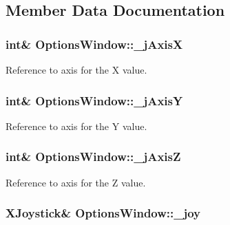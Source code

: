 \subsection{Member Data Documentation}
\hypertarget{a00006_a01d6284355011203ee6e8856a0bdf557}{}
\subsubsection[{\+\_\+j\+Axis\+X}]{\setlength{\rightskip}{0pt plus 5cm}int\& Options\+Window\+::\+\_\+j\+Axis\+X\hspace{0.3cm}{\ttfamily [private]}}\label{a00006_a01d6284355011203ee6e8856a0bdf557}


Reference to axis for the X value. 

\hypertarget{a00006_a8921d1cc5bcb527466c28feb5dcc59b1}{}
\subsubsection[{\+\_\+j\+Axis\+Y}]{\setlength{\rightskip}{0pt plus 5cm}int\& Options\+Window\+::\+\_\+j\+Axis\+Y\hspace{0.3cm}{\ttfamily [private]}}\label{a00006_a8921d1cc5bcb527466c28feb5dcc59b1}


Reference to axis for the Y value. 

\hypertarget{a00006_a47409f50a87942706baaea3d025785e3}{}
\subsubsection[{\+\_\+j\+Axis\+Z}]{\setlength{\rightskip}{0pt plus 5cm}int\& Options\+Window\+::\+\_\+j\+Axis\+Z\hspace{0.3cm}{\ttfamily [private]}}\label{a00006_a47409f50a87942706baaea3d025785e3}


Reference to axis for the Z value. 

\hypertarget{a00006_a1bf846ab681ab245f70adac30999947c}{}
\subsubsection[{\+\_\+joy}]{\setlength{\rightskip}{0pt plus 5cm}X\+Joystick\& Options\+Window\+::\+\_\+joy\hspace{0.3cm}{\ttfamily [private]}}\label{a00006_a1bf846ab681ab245f70adac30999947c}


